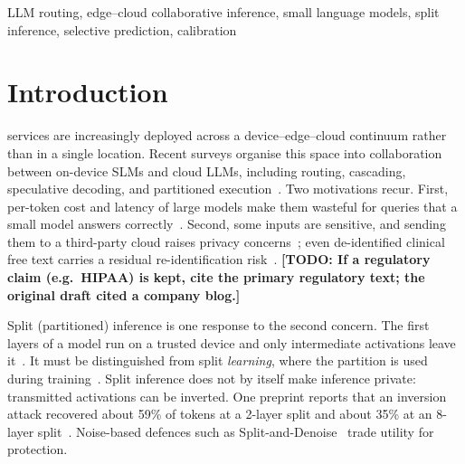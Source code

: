 \documentclass[lettersize,journal]{IEEEtran}
\newcommand{\todo}[1]{\textbf{[TODO: #1]}}
\begin{document}
\begin{IEEEkeywords}
LLM routing, edge--cloud collaborative inference, small language models,
split inference, selective prediction, calibration
\end{IEEEkeywords}

\section{Introduction}
\label{sec:intro}

 services are increasingly deployed across a
device--edge--cloud continuum rather than in a single location. Recent surveys
organise this space into collaboration between on-device SLMs and cloud LLMs,
including routing, cascading, speculative decoding, and partitioned
execution~\cite{li2026collaborative,chen2026network,moslem2026dynamic}. Two
motivations recur. First, per-token cost and latency of large models make them
wasteful for queries that a small model answers correctly~\cite{ding2024hybrid,ong2025routellm}.
Second, some inputs are sensitive, and sending them to a third-party cloud raises
privacy concerns~\cite{he2025emerged,zhang2025understanding}; even de-identified
clinical free text carries a residual re-identification risk~\cite{ford2025patient}.
\todo{If a regulatory claim (e.g.\ HIPAA) is kept, cite the primary regulatory
text; the original draft cited a company blog.}

Split (partitioned) inference is one response to the second concern. The first
layers of a model run on a trusted device and only intermediate activations
leave it~\cite{kang2017neurosurgeon,mudvari2024splitllm,lee2026browser}. It must
be distinguished from split \emph{learning}, where the partition is used during
training~\cite{vepakomma2018split,pham2025split,hukkeri2025comprehensive,alhindi2025balancing}.
Split inference does not by itself make inference private: transmitted
activations can be inverted. One preprint reports that an inversion attack
recovered about 59\% of tokens at a 2-layer split and about 35\% at an 8-layer
split~\cite{cunningham2026privacy}. Noise-based defences such as
Split-and-Denoise~\cite{mai2024split} trade utility for protection.
\end{document}
